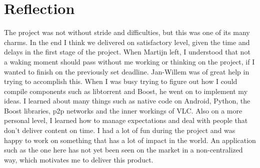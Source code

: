 \section{Reflection}
\thispagestyle{fancy}
The project was not without stride and difficulties, but this was one of its many charms. In the end I think we delivered on satisfactory level, given the time and delays in the first stage of the project. When Martijn left, I understood that not a waking moment should pass without me working or thinking on the project, if I wanted to finish on the previously set deadline. Jan-Willem was of great help in trying to accomplish this. When I was busy trying to figure out how I could compile components such as libtorrent and Boost, he went on to implement my ideas. 
I learned about many things such as native code on Android, Python, the Boost libraries, p2p networks and the inner workings of VLC. Also on a more personal level, I learned how to manage expectations and deal with people that don't deliver content on time. 
I had a lot of fun during the project and was happy to work on something that has a lot of impact in the world. An application such as the one here has not yet been seen on the market in a non-centralized way, which motivates me to deliver this product. 
